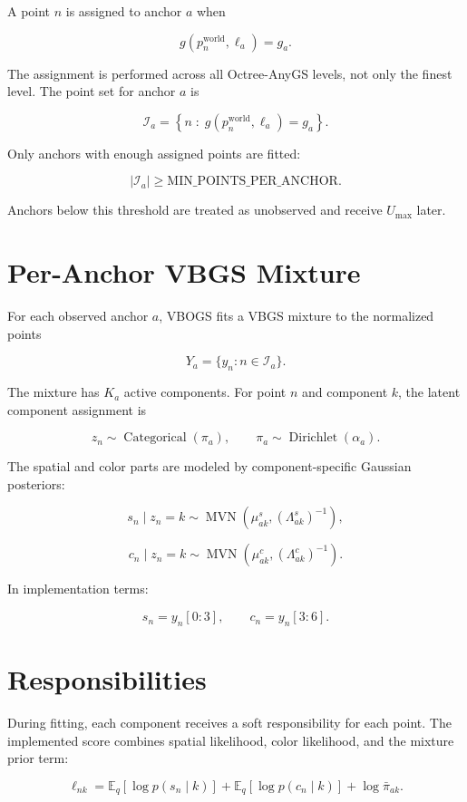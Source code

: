 \documentclass[11pt]{article}
\newcommand{\E}{\mathbb{E}}
\newcommand{\Dir}{\operatorname{Dirichlet}}
\newcommand{\Cat}{\operatorname{Categorical}}
\newcommand{\MVN}{\operatorname{MVN}}
\begin{document}
A point \(n\) is assigned to anchor \(a\) when

\[
  g(p_n^{\mathrm{world}}, \ell_a) = g_a.
\]

The assignment is performed across all Octree-AnyGS levels, not only the
finest level. The point set for anchor \(a\) is

\[
  \mathcal{I}_a
  =
  \left\{
    n
    \;:\;
    g(p_n^{\mathrm{world}}, \ell_a) = g_a
  \right\}.
\]

Only anchors with enough assigned points are fitted:

\[
  |\mathcal{I}_a|
  \geq
  \mathrm{MIN\_POINTS\_PER\_ANCHOR}.
\]

Anchors below this threshold are treated as unobserved and receive \(U_{\max}\)
later.

\section{Per-Anchor VBGS Mixture}

For each observed anchor \(a\), VBOGS fits a VBGS mixture to the normalized
points

\[
  Y_a = \{y_n : n \in \mathcal{I}_a\}.
\]

The mixture has \(K_a\) active components. For point \(n\) and component \(k\),
the latent component assignment is

\[
  z_n \sim \Cat(\pi_a),
  \qquad
  \pi_a \sim \Dir(\alpha_a).
\]

The spatial and color parts are modeled by component-specific Gaussian
posteriors:

\[
  s_n \mid z_n = k
  \sim
  \MVN(\mu^s_{ak}, (\Lambda^s_{ak})^{-1}),
\]

\[
  c_n \mid z_n = k
  \sim
  \MVN(\mu^c_{ak}, (\Lambda^c_{ak})^{-1}).
\]

In implementation terms:

\[
  s_n = y_n[0:3],
  \qquad
  c_n = y_n[3:6].
\]

\section{Responsibilities}

During fitting, each component receives a soft responsibility for each point.
The implemented score combines spatial likelihood, color likelihood, and the
mixture prior term:

\[
  \ell_{nk}
  =
  \E_q[\log p(s_n \mid k)]
  +
  \E_q[\log p(c_n \mid k)]
  +
  \log \bar{\pi}_{ak}.
\]
\end{document}
